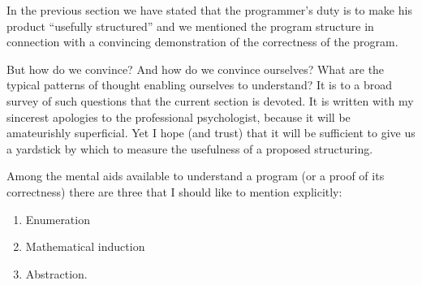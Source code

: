 In the previous section we have stated that the programmer's duty is to
make his product ``usefully structured'' and we mentioned the program structure
in connection with a convincing demonstration of the correctness of the program.

But how do we convince? And how do we convince ourselves? What are the
typical patterns of thought enabling ourselves to understand? It is to a broad
survey of such questions that the current section is devoted. It is written with
my sincerest apologies to the professional psychologist, because it will be
amateurishly superficial. Yet I hope (and trust) that it will be sufficient to
give us a yardstick by which to measure the usefulness of a proposed structuring.

Among the mental aids available to understand a program (or a proof of its
correctness) there are three that I should like to mention explicitly:
\begin{enumerate}[1) ]
    \item Enumeration
    \item Mathematical induction
    \item Abstraction.
\end{enumerate}